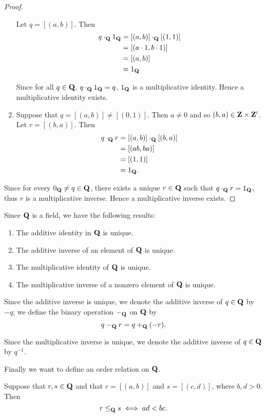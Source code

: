 \begin{proof}
\begin{enumerate}[label=(\roman*)]
Let $q=[(a,b)]$. Then
\begin{align*}
q\cdot_\mathbf Q1_\mathbf Q
&=[(a,b)]\cdot_\mathbf Q[(1,1)]\\
&=[(a\cdot1,b\cdot1)]\\
&=[(a,b)]\\\
&=1_\mathbf Q
\end{align*}

Since for all $q\in\mathbf Q$, $q\cdot_\mathbf Q1_\mathbf Q=q$, $1_\mathbf Q$ is a multiplicative identity. Hence a multiplicative identity exists.

\item Suppose that $q=[(a,b)]\neq[(0,1)]$. Then $a\neq0$ and so $(b,a)\in\mathbf Z\times\mathbf Z^\prime$. Let $r=[(b,a)]$. Then
\begin{align*}
q\cdot_\mathbf Q r
&=[(a,b)]\cdot_\mathbf Q[(b,a)]\\
&=[(ab,ba)]\\
&=[(1,1)]\\
&=1_\mathbf Q.
\end{align*}
\end{enumerate}
Since for every $0_\mathbf Q\neq q\in\mathbf Q$, there exists a unique $r\in\mathbf Q$ such that $q\cdot_\mathbf Q r=1_\mathbf Q$, thus $r$ is a multiplicative inverse. Hence a multiplicative inverse exists.
\end{proof}

Since $\QQ$ is a field, we have the following results:
\begin{enumerate}[label=(\arabic*)]
\item The additive identity in $\QQ$ is unique.
\item The additive inverse of an element of $\QQ$ is unique.
\item The multiplicative identity of $\QQ$ is unique.
\item The multiplicative inverse of a nonzero element of $\QQ$ is unique.
\end{enumerate}

\begin{notation}
Since the additive inverse is unique, we denote the additive inverse of $q\in\mathbf Q$ by $-q$; we define the binary operation $-_\mathbf Q$ on $\QQ$ by
\[q-_\mathbf Q r=q+_\mathbf Q(-r).\]
\end{notation}

\begin{notation}
Since the multiplicative inverse is unique, we denote the additive inverse of $q\in\mathbf Q$ by $q^{-1}$.
\end{notation}

Finally we want to define an order relation on $\QQ$.
\begin{definition}[Order on $\QQ$]
Suppose that $r,s\in\mathbf Q$ and that $r=[(a,b)]$ and $s=[(c,d)]$, where $b,d>0$. Then
\[r\le_\mathbf Q s\iff ad<bc.\]
\end{definition}

